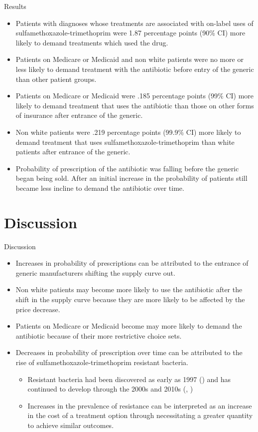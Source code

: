 \documentclass{beamer}
\begin{document}
\begin{frame}{Results}
\begin{itemize}
\item Patients with diagnoses whose treatments are associated with on-label uses of sulfamethoxazole-trimethoprim were 1.87 percentage points (90\% CI) more likely to demand treatments which used the drug.
\item Patients on Medicare or Medicaid and non white patients were no more or less likely to demand treatment with the antibiotic before entry of the generic than other patient groups.
\item Patients on Medicare or Medicaid were .185 percentage points (99\% CI) more likely to demand treatment that uses the antibiotic than those on other forms of insurance after entrance of the generic.
\item Non white patients were .219 percentage points (99.9\% CI) more likely to demand treatment that uses sulfamethoxazole-trimethoprim than white patients after entrance of the generic.
\item Probability of prescription of the antibiotic was falling before the generic began being sold. After an initial increase in the probability of patients still became less incline to demand the antibiotic over time.
\end{itemize}
\end{frame}

\section{Discussion}
\begin{frame}{Discussion}
\begin{itemize}
\item Increases in probability of prescriptions can be attributed to the entrance of generic manufacturers shifting the supply curve out. 
\item Non white patients may become more likely to use the antibiotic after the shift in the supply curve because they are more likely to be affected by the price decrease.
\item Patients on Medicare or Medicaid become may more likely to demand the antibiotic because of their more restrictive choice sets.
\item  Decreases in probability of prescription over time can be attributed to the rise of sulfamethoxazole-trimethoprim resistant bacteria.
\begin{itemize}
  \item Resistant bacteria had been discovered as early as 1997 (\cite{gales_urinary_2002}) and has continued to develop through the 2000s and 2010s (\cite{noauthor_resistance_nodate}, \cite{khamash_increasing_2019})
  \item Increases in the prevalence of resistance can be interpreted as an increase in the cost of a treatment option through necessitating a greater quantity to achieve similar outcomes.
\end{itemize}
\end{itemize}
\end{frame}
\end{document}
